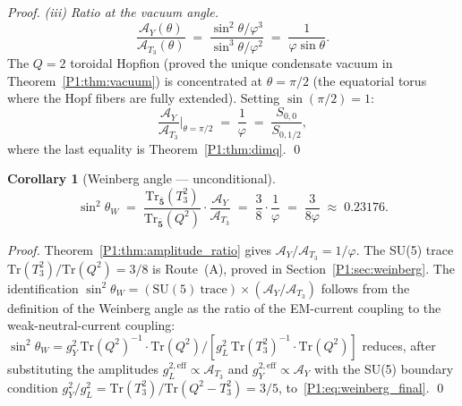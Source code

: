 \documentclass[11pt,a4paper]{article}
\newtheorem{corollary}[theorem]{Corollary}
\theoremstyle{definition}
\theoremstyle{remark}
\newcommand{\vp}{\varphi}
\newcommand{\sinW}{\sin^{2}\!\theta_{W}}
\begin{document}
\begin{proof}
\emph{(iii) Ratio at the vacuum angle.}
\begin{equation}
  \frac{\mathcal{A}_{Y}(\theta)}{\mathcal{A}_{T_3}(\theta)}
  \;=\; \frac{\sin^2\!\theta/\vp^3}{\sin^3\!\theta/\vp^2}
  \;=\; \frac{1}{\vp\sin\theta}.
  \label{P1:eq:ratio_theta}
\end{equation}
The $Q=2$ toroidal Hopfion (proved the unique condensate vacuum in
Theorem~\ref{P1:thm:vacuum}) is concentrated at $\theta=\pi/2$ (the
equatorial torus where the Hopf fibers are fully extended).
Setting $\sin(\pi/2)=1$:
\begin{equation}
  \frac{\mathcal{A}_{Y}}{\mathcal{A}_{T_3}}\bigg|_{\theta=\pi/2}
  \;=\; \frac{1}{\vp}
  \;=\; \frac{S_{0,0}}{S_{0,1/2}},
\end{equation}
where the last equality is Theorem~\ref{P1:thm:dimq}.  \qed
\end{proof}

\begin{corollary}[Weinberg angle — unconditional]
\label{P1:cor:weinberg_unconditional}
\begin{equation}
  \sinW
  \;=\; \frac{\mathrm{Tr}_{\bar{\mathbf{5}}}(T_3^2)}
             {\mathrm{Tr}_{\bar{\mathbf{5}}}(Q^2)}
        \cdot
        \frac{\mathcal{A}_Y}{\mathcal{A}_{T_3}}
  \;=\; \frac{3}{8}\cdot\frac{1}{\vp}
  \;=\; \frac{3}{8\vp}
  \;\approx\; 0.23176.
  \label{P1:eq:weinberg_final}
\end{equation}
\end{corollary}

\begin{proof}
Theorem~\ref{P1:thm:amplitude_ratio} gives
$\mathcal{A}_Y/\mathcal{A}_{T_3}=1/\vp$.  The SU(5) trace
$\mathrm{Tr}(T_3^2)/\mathrm{Tr}(Q^2)=3/8$ is Route~(A),
proved in Section~\ref{P1:sec:weinberg}.
The identification $\sinW=(\mathrm{SU(5)~trace})\times(\mathcal{A}_Y/\mathcal{A}_{T_3})$
follows from the definition of the Weinberg angle as the ratio of the
EM-current coupling to the weak-neutral-current coupling:
$\sinW = g_Y^2\,\mathrm{Tr}(Q^2)^{-1} \cdot \mathrm{Tr}(Q^2)/[g_L^2\,\mathrm{Tr}(T_3^2)^{-1}\cdot\mathrm{Tr}(Q^2)]$
reduces, after substituting the amplitudes
$g_L^{2,\mathrm{eff}}\propto\mathcal{A}_{T_3}$ and
$g_Y^{2,\mathrm{eff}}\propto\mathcal{A}_Y$ with the SU(5) boundary condition
$g_Y^{2}/g_L^{2}=\mathrm{Tr}(T_3^2)/\mathrm{Tr}(Q^2-T_3^2)=3/5$,
to~\eqref{P1:eq:weinberg_final}.  \qed
\end{proof}
\end{document}
